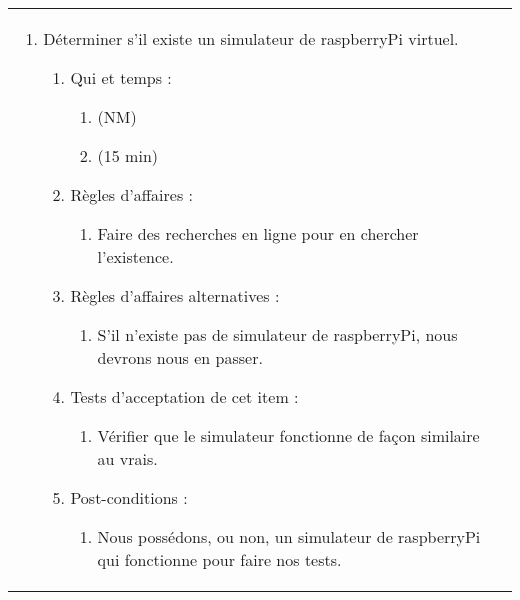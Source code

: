 \begin{longtable}{|l|p{}|}
\begin{enumerate}[label*=\arabic*.]
        \item Déterminer s'il existe un simulateur de raspberryPi virtuel.
                \begin{enumerate}[label*=\arabic*.]
                                \item Qui et temps :
                                \begin{enumerate}[label*=\arabic*.]
                                    \item (NM)
                                    \item (15 min)
                                \end{enumerate}
                                \item Règles d'affaires :
                                \begin{enumerate}[label*=\arabic*.]
                                    \item Faire des recherches en ligne pour en chercher l'existence.
                                \end{enumerate}
                                \item Règles d'affaires alternatives :
                                \begin{enumerate}[label*=\arabic*.]
                                    \item S'il n'existe pas de simulateur de raspberryPi, nous devrons nous en passer.
                                \end{enumerate}
                                \item Tests d'acceptation de cet item :
                                \begin{enumerate}[label*=\arabic*.]
                                    \item Vérifier que le simulateur fonctionne de façon similaire au vrais.
                                \end{enumerate}
                                \item Post-conditions :
                                \begin{enumerate}[label*=\arabic*.]
                                    \item Nous possédons, ou non, un simulateur de raspberryPi qui fonctionne pour faire nos tests.
                                \end{enumerate}
                            \end{enumerate}
                         \end{enumerate} \\


\end{longtable}
